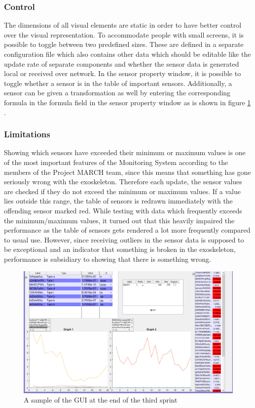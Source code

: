 \subsubsection{Control}
The dimensions of all visual elements are static in order to have better control over the visual representation. To accommodate people with small screens, it is possible to toggle between two predefined sizes. These are defined in a separate configuration file which also contains other data which should be editable like the update rate of separate components and whether the sensor data is generated local or received over network. In the sensor property window, it is possible to toggle whether a sensor is in the table of important sensors. Additionally, a sensor can be given a transformation as well by entering the corresponding formula in the formula field in the sensor property window as is shown in figure \ref{fig:GUIV2} . 


\subsubsection{Limitations}
Showing which sensors have exceeded their minimum or maximum values is one of the most important features of the Monitoring System according to the members of the Project MARCH team, since this means that something has gone seriously wrong with the exoskeleton. Therefore each update, the sensor values are checked if they do not exceed the minimum or maximum values. If a value lies outside this range, the table of sensors is redrawn immediately with the offending sensor marked red. While testing with data which frequently exceeds the minimum/maximum values, it turned out that this heavily impaired the performance as the table of sensors gets rendered a lot more frequently compared to usual use. However, since receiving outliers in the sensor data is supposed to be exceptional and an indicator that something is broken in the exoskeleton, performance is subsidiary to showing that there is something wrong.


\begin{figure}[H]
	\centering
	\includegraphics[width=.75\textwidth]{images/GUIV2}
	\caption{A sample of the GUI at the end of the third sprint} 
	\label{fig:GUIV2}
\end{figure} 

